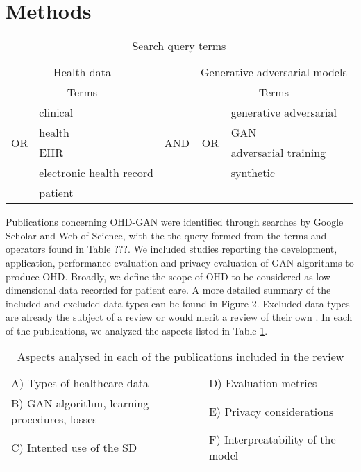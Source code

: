 \section{Methods}

\begin{table}[h]
  \center
    \begin{tabular}{@{}clccl@{}} \toprule
	    \multicolumn{2}{c}{Health data} & & \multicolumn{2}{c}{Generative adversarial models} \\ \cmidrule{1-2} \cmidrule{4-5}
	    \multicolumn{2}{c}{Terms} & {} & \multicolumn{2}{c}{Terms} \\ \cmidrule{2-2} \cmidrule{5-5}
	    \multirow{4}{*}{OR} & clinical & \multirow[t]{4}{*}{\quad AND\quad} & \multirow{4}{*}{OR} & generative adversarial\\
	    {} & health & {} & {} & GAN \\ 
	    {} & EHR & {} & {} & adversarial training \\
	    {} & electronic health record & {} & {} & synthetic  \\
	    {} & patient & {} & {} & {} \\
	    \bottomrule
    \end{tabular}
    \caption{{Search query terms}}\label{tab:search}
\end{table}

Publications concerning OHD-GAN were identified through searches by Google Scholar and Web of Science, with the the query formed from the terms and operators found in Table ???. We included studies reporting the development, application, performance evaluation and privacy evaluation of GAN algorithms to produce OHD. Broadly, we define the scope of OHD to be considered as low-dimensional data recorded for patient care. A more detailed summary of the included and excluded data types can be found in Figure 2. Excluded data types are already the subject of a review or would merit a review of their own \cite{Yi_2019}\cite{Nakata2019}\cite{Anwar_2018}. In each of the publications, we analyzed the aspects listed in Table \ref{tab:search}.\par


\begin{table}
\centering
  \caption{Aspects analysed in each of the publications included in the review\label{tab:aspects}}
  \begin{tabular}{ll}\toprule
  A) Types of healthcare data & D) Evaluation metrics\\
  B) GAN algorithm, learning procedures, losses & E) Privacy considerations\\
  C) Intented use of the SD & F) Interpreatability of the model\\\bottomrule
  \end{tabular}
\end{table}

